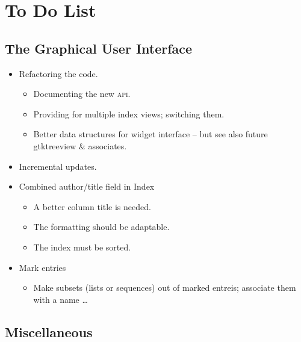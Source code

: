 \cleardoublepage
  \setcounter{secnumdepth}{-1}
  \section{To Do List}
\label{sec:todo}




\subsection{The Graphical User Interface}
\label{todo:next:gui}


  \begin{itemize}
  \item \Active Refactoring the  code. 
    \begin{itemize}
    \item Documenting the new \textsc{api}.
    \item Providing for multiple index views; switching them.
    \item \Think Better data structures for widget interface -- but see
      also future gtktreeview \& associates.
    
    \end{itemize}
  \item \Done Incremental updates. 

  \item \Done Combined author/title field in Index 
    \begin{itemize}
    \item A better column title is needed.
    \item The formatting should be adaptable.
    \item The index must be sorted.
    \end{itemize}
  \item \Done Mark entries
    \begin{itemize}
    \item Make subsets (lists or sequences) out of marked entreis;
      associate them with a name \dots
    \end{itemize}
 
  \end{itemize}


\subsection{Miscellaneous}
\label{sec:next:misc}

